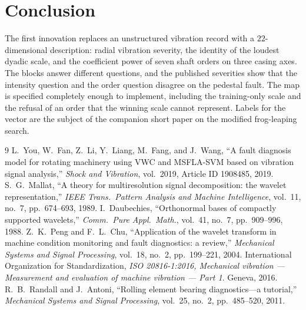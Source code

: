 \documentclass[11pt,a4paper]{article}
\begin{document}
\section{Conclusion}

The first innovation replaces an unstructured vibration record with a $22$-dimensional description: radial vibration severity, the identity of the loudest dyadic scale, and the coefficient power of seven shaft orders on three casing axes.
The blocks answer different questions, and the published severities show that the intensity question and the order question disagree on the pedestal fault.
The map is specified completely enough to implement, including the training-only scale and the refusal of an order that the winning scale cannot represent.
Labels for the vector are the subject of the companion short paper on the modified frog-leaping search.

\begin{thebibliography}{9}
L.~You, W.~Fan, Z.~Li, Y.~Liang, M.~Fang, and J.~Wang,
``A fault diagnosis model for rotating machinery using VWC and MSFLA-SVM based on vibration signal analysis,''
\textit{Shock and Vibration}, vol.~2019, Article ID 1908485, 2019.
S.~G.~Mallat,
``A theory for multiresolution signal decomposition: the wavelet representation,''
\textit{IEEE Trans.\ Pattern Analysis and Machine Intelligence}, vol.~11, no.~7, pp.~674--693, 1989.
I.~Daubechies,
``Orthonormal bases of compactly supported wavelets,''
\textit{Comm.\ Pure Appl.\ Math.}, vol.~41, no.~7, pp.~909--996, 1988.
Z.~K.~Peng and F.~L.~Chu,
``Application of the wavelet transform in machine condition monitoring and fault diagnostics: a review,''
\textit{Mechanical Systems and Signal Processing}, vol.~18, no.~2, pp.~199--221, 2004.
International Organization for Standardization,
\textit{ISO 20816-1:2016, Mechanical vibration --- Measurement and evaluation of machine vibration --- Part 1}.
Geneva, 2016.
R.~B.~Randall and J.~Antoni,
``Rolling element bearing diagnostics---a tutorial,''
\textit{Mechanical Systems and Signal Processing}, vol.~25, no.~2, pp.~485--520, 2011.
\end{thebibliography}
\end{document}
